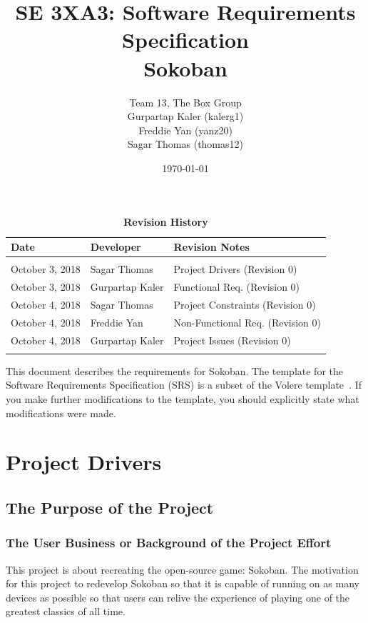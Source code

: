 \documentclass[12pt, titlepage]{article}
\title{SE 3XA3: Software Requirements Specification\\Sokoban}
\author{Team 13, The Box Group
		\\ Gurpartap Kaler (kalerg1)
		\\ Freddie Yan (yanz20)
		\\ Sagar Thomas (thomas12)
}
\date{\today}
\begin{document}
\maketitle
{}
\tableofcontents
\listoftables
\listoffigures
\begin{table}[!b]
\caption{\bf Revision History}
\begin{tabularx}{\textwidth}{p{3cm}p{2cm}X}
\toprule {\bf Date} & {\bf Developer} & {\bf Revision Notes} \\
\midrule
\\
October 3, 2018 & Sagar Thomas & Project Drivers (Revision 0)\\
October 3, 2018 & Gurpartap Kaler & Functional Req. (Revision 0)\\
October 4, 2018 & Sagar Thomas & Project Constraints (Revision 0)\\
October 4, 2018 & Freddie Yan & Non-Functional Req. (Revision 0)\\
October 4, 2018 & Gurpartap Kaler & Project Issues (Revision 0)\\
\\
\bottomrule
\end{tabularx}
\end{table}

\newpage


This document describes the requirements for Sokoban. The template for the Software
Requirements Specification (SRS) is a subset of the Volere
template~\citep{RobertsonAndRobertson2012}.  If you make further modifications
to the template, you should explicitly state what modifications were made.

\section{Project Drivers}

\subsection{The Purpose of the Project}
\subsubsection{The User Business or Background of the Project Effort}

This project is about recreating the open-source game: Sokoban. The motivation for this project to redevelop Sokoban so that it is capable of running on as many devices as possible so that users can relive the experience of playing one of the greatest classics of all time.
\end{document}
